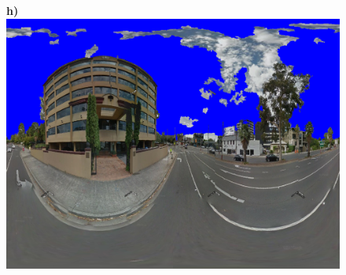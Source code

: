 \documentclass[final,3p,times,authoryear]{elsarticle}
\begin{document}
\begin{figure}
\textbf{h)}\includegraphics[scale=0.08]{Images/mean/4880_7_8_300_ms_sky_mark.png} 


\end{figure}
\end{document}
